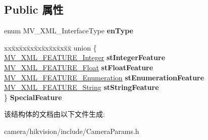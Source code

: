 \subsection*{Public 属性}
\begin{DoxyCompactItemize}
\item 
\mbox{\label{struct___m_v___x_m_l___c_a_m_e_r_a___f_e_a_t_u_r_e___a5740e69af6a0b78dbf4fea7c402fa322}} 
enum M\+V\+\_\+\+X\+M\+L\+\_\+\+Interface\+Type {\bfseries en\+Type}
\item 
\mbox{\label{struct___m_v___x_m_l___c_a_m_e_r_a___f_e_a_t_u_r_e___a0b1dd626f39f00083003297c61717b5f}} 
\begin{tabbing}
xx\=xx\=xx\=xx\=xx\=xx\=xx\=xx\=xx\=\kill
union \{\\
\>\hyperlink{struct___m_v___x_m_l___f_e_a_t_u_r_e___integer__}{MV\_XML\_FEATURE\_Integer} {\bfseries stIntegerFeature}\\
\>\hyperlink{struct___m_v___x_m_l___f_e_a_t_u_r_e___float__}{MV\_XML\_FEATURE\_Float} {\bfseries stFloatFeature}\\
\>\hyperlink{struct___m_v___x_m_l___f_e_a_t_u_r_e___enumeration__}{MV\_XML\_FEATURE\_Enumeration} {\bfseries stEnumerationFeature}\\
\>\hyperlink{struct___m_v___x_m_l___f_e_a_t_u_r_e___string__}{MV\_XML\_FEATURE\_String} {\bfseries stStringFeature}\\
\} {\bfseries SpecialFeature}\\

\end{tabbing}\end{DoxyCompactItemize}


该结构体的文档由以下文件生成\+:\begin{DoxyCompactItemize}
\item 
camera/hikvision/include/Camera\+Params.\+h\end{DoxyCompactItemize}
